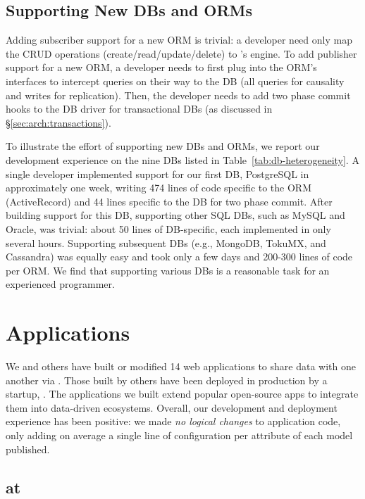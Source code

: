 \subsection{Supporting New DBs and ORMs}
Adding subscriber support for a new ORM is trivial: a developer need only map the CRUD operations (create/read/update/delete) to \synapse's engine.
To add publisher support for a new ORM, a developer needs to first plug into the ORM's interfaces to intercept queries on their way to the DB (all queries for causality and writes for replication).
Then, the developer needs to add two phase commit hooks to the DB driver for transactional DBs (as discussed in \S\ref{sec:arch:transactions}).

To illustrate the effort of supporting new DBs and ORMs, we report our development experience on the nine DBs listed in Table~\ref{tab:db-heterogeneity}.
A single developer implemented support for our first DB, PostgreSQL in approximately one week, writing 474 lines of code specific to the ORM (ActiveRecord) and 44 lines specific to the DB for two phase commit.
After building support for this DB, supporting other SQL DBs, such as MySQL and Oracle, was trivial: about 50 lines of DB-specific, each implemented in only several hours.
Supporting subsequent DBs (e.g., MongoDB, TokuMX, and Cassandra) was equally easy and took only a few days and 200-300 lines of code per ORM.
We find that supporting various DBs is a reasonable task for an experienced programmer.
\section{Applications}
\label{sec:apps}

We and others have built or modified 14 web applications to share data with
one another via \synapse.  Those built by others have been
deployed in production by a startup, \crowdtap.  The applications we built
extend popular open-source apps to integrate them into data-driven ecosystems. 
Overall, our development and deployment experience has been positive: we made
{\em no logical changes} to application code, only adding on
average a single line of configuration per attribute of each model published.


\subsection{\synapse at \crowdtap}
\label{sec:apps:crowdtap}

